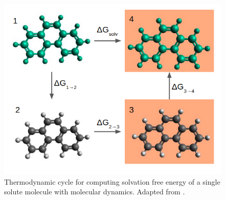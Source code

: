 	\begin{figure}[th]
		\centering
		\includegraphics[scale=0.6]{Figures/cicclotermo}
		\caption{Thermodynamic cycle for computing solvation free energy of a single solute molecule with molecular dynamics. Adapted from .}
		\label{thermcy}
	\end{figure}
	
